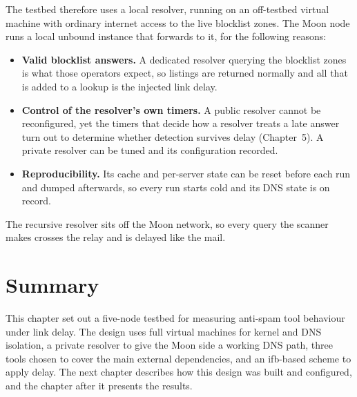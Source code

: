 The testbed therefore uses a local resolver, running on an off-testbed virtual machine with ordinary internet access to the live blocklist zones. The Moon node runs a local unbound instance that forwards to it, for the following reasons:

\begin{itemize}
  \item \textbf{Valid blocklist answers.} A dedicated resolver querying the blocklist zones is what those operators expect, so listings are returned normally and all that is added to a lookup is the injected link delay.
  \item \textbf{Control of the resolver's own timers.} A public resolver cannot
  be reconfigured, yet the timers that decide how a resolver treats a late answer
  turn out to determine whether detection survives delay (Chapter~5). A private
  resolver can be tuned and its configuration recorded.
  \item \textbf{Reproducibility.} Its cache and per-server state can be reset
  before each run and dumped afterwards, so every run starts cold and its DNS
  state is on record.
\end{itemize}

The recursive resolver sits off the Moon network, so every query the scanner makes crosses the relay and is delayed like the mail.


\section{Summary}
\label{sec:design-summary}

This chapter set out a five-node testbed for measuring anti-spam tool behaviour
under link delay. The design uses full virtual machines for kernel and DNS
isolation, a private resolver to give the Moon side a working DNS path, three tools
chosen to cover the main external dependencies, and an ifb-based scheme to apply
delay. The next chapter describes how this design was built and configured, and the chapter after it presents the results.